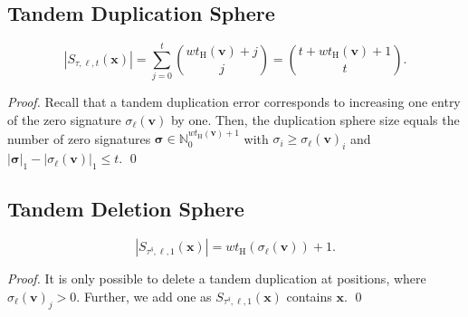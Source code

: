 \documentclass[a4paper]{llncs}
\newcommand{\ve}[1]{\boldsymbol{#1}}
\begin{document}
	\subsection{Tandem Duplication Sphere}
	\begin{lemma}
		\begin{equation*}
		|S_{\tau, \ell, t}(\ve{x})| = \sum_{j=0}^t \binom{wt_{\mathrm{H}}(\ve{v})+j}{j} = \binom{t+wt_{\mathrm{H}}(\ve{v})+1}{t}.
		\end{equation*}
	\end{lemma}
	\begin{proof}
		Recall that a tandem duplication error corresponds to increasing one entry of the zero signature $\sigma_\ell(\ve{v})$ by one. Then, the duplication sphere size equals the number of zero signatures $\ve{\sigma} \in \mathbb{N}_0^{wt_{\mathrm{H}}(\ve{v})+1}$ with $\sigma_i \geq \sigma_\ell(\ve{v})_i$ and $|\ve{\sigma}|_1-|\sigma_\ell(\ve{v})|_1 \leq t$. \qed
	\end{proof}
	\subsection{Tandem Deletion Sphere}
	\begin{lemma}\label{lemma:tandem_deletion_sphere}
		\begin{equation*}
		|S_{\tau^\delta, \ell, 1}(\ve{x})| = wt_{\mathrm{H}}(\sigma_\ell(\ve{v})) + 1.
		\end{equation*}
	\end{lemma}
	\begin{proof}
		It is only possible to delete a tandem duplication at positions, where $\sigma_\ell(\ve{v})_j > 0$. Further, we add one as $S_{\tau^\delta, \ell, 1}(\ve{x})$ contains $\ve{x}$. \qed
	\end{proof}
	
\end{document}

